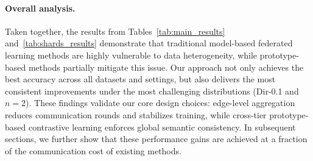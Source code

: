 \documentclass[twoside]{article}
\begin{document}
            \paragraph{Overall analysis.} 
            Taken together, the results from Tables~\ref{tab:main_results} and~\ref{tab:shards_results} demonstrate that traditional model-based federated learning methods are highly vulnerable to data heterogeneity, while prototype-based methods partially mitigate this issue. 
            Our approach not only achieves the best accuracy across all datasets and settings, but also delivers the most consistent improvements under the most challenging distributions (Dir-0.1 and $n=2$). 
            These findings validate our core design choices: edge-level aggregation reduces communication rounds and stabilizes training, while cross-tier prototype-based contrastive learning enforces global semantic consistency. 
            In subsequent sections, we further show that these performance gains are achieved at a fraction of the communication cost of existing methods. 
            
\end{document}

